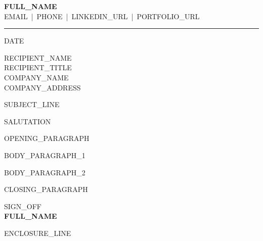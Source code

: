 \documentclass[a4paper,11pt]{article}
\begin{document}
\begin{center}
  {\Huge \textbf{{{FULL_NAME}}}}\\[4pt]
  {\small {{EMAIL}} \,|\, {{PHONE}} \,|\, {{LINKEDIN_URL}} \,|\, {{PORTFOLIO_URL}}}\\
  \rule{0.5\textwidth}{0.4pt}
\end{center}

\vspace{1em}
{{DATE}}

\vspace{1em}
{{RECIPIENT_NAME}}\\
{{RECIPIENT_TITLE}}\\
{{COMPANY_NAME}}\\
{{COMPANY_ADDRESS}}

\vspace{1.5em}
{{SUBJECT_LINE}}

\vspace{1em}
{{SALUTATION}}

{{OPENING_PARAGRAPH}}

{{BODY_PARAGRAPH_1}}

{{BODY_PARAGRAPH_2}}

{{CLOSING_PARAGRAPH}}

\vspace{1.5em}
{{SIGN_OFF}}\\[2em]
\textbf{{{FULL_NAME}}}

\vspace{2em}
{{ENCLOSURE_LINE}}
\end{document}
